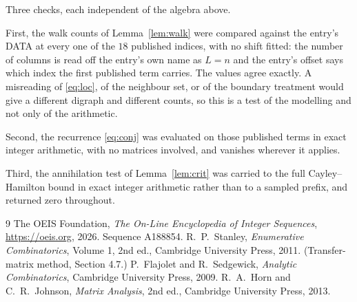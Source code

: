 \documentclass[11pt,a4paper]{article}
\theoremstyle{plain}
\theoremstyle{definition}
\begin{document}
Three checks, each independent of the algebra above.

First, the walk counts of Lemma~\ref{lem:walk} were compared against the entry's DATA at
every one of the $18$ published indices, with no shift fitted: the number of columns is
read off the entry's own name as $L=n$ and the entry's offset says which index the first
published term carries. The values agree exactly. A misreading of \eqref{eq:loc}, of the
neighbour set, or of the boundary treatment would give a different digraph and different
counts, so this is a test of the modelling and not only of the arithmetic.

Second, the recurrence \eqref{eq:conj} was evaluated on those published terms in exact
integer arithmetic, with no matrices involved, and vanishes wherever it applies.

Third, the annihilation test of Lemma~\ref{lem:crit} was carried to the full
Cayley--Hamilton bound in exact integer arithmetic rather than to a sampled prefix, and
returned zero throughout.

\begin{thebibliography}{9}
 The OEIS Foundation, \emph{The On-Line Encyclopedia of Integer
Sequences}, \url{https://oeis.org}, 2026. Sequence A188854.
 R.~P.~Stanley, \emph{Enumerative Combinatorics}, Volume 1, 2nd ed.,
Cambridge University Press, 2011. (Transfer-matrix method, Section 4.7.)
 P.~Flajolet and R.~Sedgewick, \emph{Analytic Combinatorics}, Cambridge
University Press, 2009.
 R.~A.~Horn and C.~R.~Johnson, \emph{Matrix Analysis}, 2nd ed., Cambridge
University Press, 2013.
\end{thebibliography}
\end{document}
